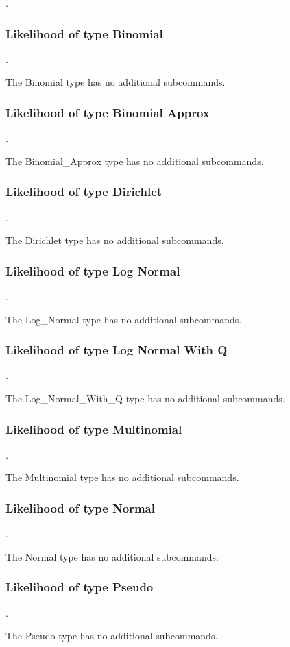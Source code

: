 .
\label{syntax:Likelihood}

\subsubsection{Likelihood of type Binomial}
.
\label{syntax:Likelihood-Binomial}

The Binomial type has no additional subcommands.
\subsubsection{Likelihood of type Binomial Approx}
.
\label{syntax:Likelihood-BinomialApprox}

The Binomial\_Approx type has no additional subcommands.
\subsubsection{Likelihood of type Dirichlet}
.
\label{syntax:Likelihood-Dirichlet}

The Dirichlet type has no additional subcommands.
\subsubsection{Likelihood of type Log Normal}
.
\label{syntax:Likelihood-LogNormal}

The Log\_Normal type has no additional subcommands.
\subsubsection{Likelihood of type Log Normal With Q}
.
\label{syntax:Likelihood-LogNormalWithQ}

The Log\_Normal\_With\_Q type has no additional subcommands.
\subsubsection{Likelihood of type Multinomial}
.
\label{syntax:Likelihood-Multinomial}

The Multinomial type has no additional subcommands.
\subsubsection{Likelihood of type Normal}
.
\label{syntax:Likelihood-Normal}

The Normal type has no additional subcommands.
\subsubsection{Likelihood of type Pseudo}
.
\label{syntax:Likelihood-Pseudo}

The Pseudo type has no additional subcommands.
